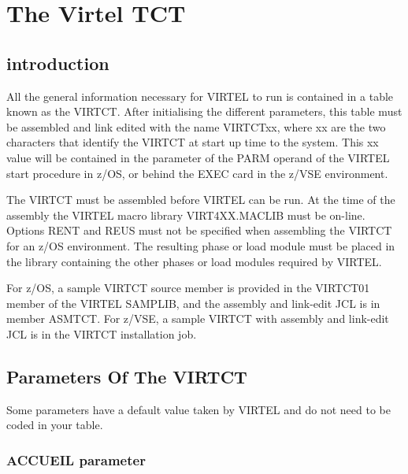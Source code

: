 \documentclass[letterpaper,10pt,english]{sphinxmanual}
\begin{document}
\chapter{The Virtel TCT}
\label{\detokenize{Installation_Guide:index-28}}\label{\detokenize{Installation_Guide:the-virtel-tct}}

\section{introduction}
\label{\detokenize{Installation_Guide:id5}}
All the general information necessary for VIRTEL to run is contained in a table known as the VIRTCT. After initialising the different  parameters, this table must be assembled and link edited with the name VIRTCTxx, where xx are the two characters that identify the VIRTCT at start up time to the system. This xx value will be contained in the parameter of the PARM operand of the VIRTEL start procedure in z/OS, or behind the EXEC card in the z/VSE environment.

The VIRTCT must be assembled before VIRTEL can be run. At the time of the assembly the VIRTEL macro library VIRT4XX.MACLIB must be on-line. Options RENT and REUS must not be specified when assembling the VIRTCT for an z/OS environment. The resulting phase or load module must be placed in the library containing the other phases or load modules required by VIRTEL.

For z/OS, a sample VIRTCT source member is provided in the VIRTCT01 member of the VIRTEL SAMPLIB, and the assembly and link-edit JCL is in member ASMTCT. For z/VSE, a sample VIRTCT with assembly and link-edit JCL is in the VIRTCT installation job.


\section{Parameters Of The VIRTCT}
\label{\detokenize{Installation_Guide:parameters-of-the-virtct}}
Some parameters have a default value taken by VIRTEL and do not need to be coded in your table.


\subsection{ACCUEIL parameter}
\label{\detokenize{Installation_Guide:index-29}}\label{\detokenize{Installation_Guide:accueil-parameter}}
\begin{sphinxVerbatim}[commandchars=\\\{\}]
\PYG{p}{[}\PYG{p}{]} 
\end{sphinxVerbatim}
\end{document}
